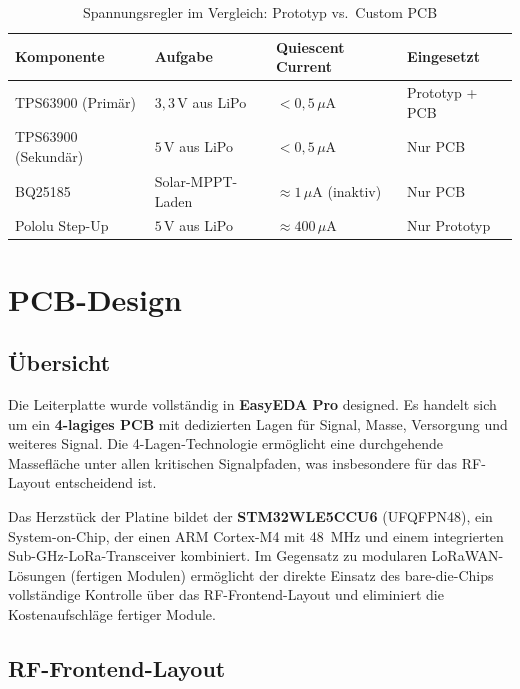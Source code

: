 \begin{table}[H]
  \centering
  \begin{tabular}{llll}
    \hline
    \textbf{Komponente} & \textbf{Aufgabe} & \textbf{Quiescent Current} & \textbf{Eingesetzt} \\
    \hline
    TPS63900 (Primär) & $3{,}3\,\text{V}$ aus LiPo  & $< 0{,}5\,\mu\text{A}$ & Prototyp + PCB \\
    TPS63900 (Sekundär) & $5\,\text{V}$ aus LiPo & $< 0{,}5\,\mu\text{A}$ & Nur PCB \\
    BQ25185 & Solar-MPPT-Laden & $\approx 1\,\mu\text{A}$ (inaktiv) & Nur PCB \\
    Pololu Step-Up & $5\,\text{V}$ aus LiPo & $\approx 400\,\mu\text{A}$ & Nur Prototyp \\
    \hline
  \end{tabular}
  \caption{Spannungsregler im Vergleich: Prototyp vs.\ Custom PCB}
  \label{tab:regler}
\end{table}

\newpage

\section*{PCB-Design}

\subsection*{Übersicht}

Die Leiterplatte wurde vollständig in \textbf{EasyEDA Pro} designed. Es handelt sich um ein \textbf{4-lagiges PCB} mit dedizierten Lagen für Signal, Masse, Versorgung und weiteres Signal. Die 4-Lagen-Technologie ermöglicht eine durchgehende Massefläche unter allen kritischen Signalpfaden, was insbesondere für das RF-Layout entscheidend ist.

Das Herzstück der Platine bildet der \textbf{STM32WLE5CCU6} (UFQFPN48), ein System-on-Chip, der einen ARM Cortex-M4 mit 48~MHz und einem integrierten Sub-GHz-LoRa-Transceiver kombiniert. Im Gegensatz zu modularen LoRaWAN-Lösungen (fertigen Modulen) ermöglicht der direkte Einsatz des bare-die-Chips vollständige Kontrolle über das RF-Frontend-Layout und eliminiert die Kostenaufschläge fertiger Module.

\subsection*{RF-Frontend-Layout}

